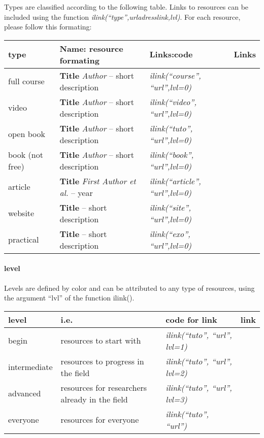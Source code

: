 \documentclass[
]{article}
\begin{document}
Types are classified according to the following table. Links to
resources can be included using the function
\emph{ilink(``type'',urladresslink,lvl)}. For each resource, please
follow this formating:

\begin{longtable}[]{@{}
  >{\raggedright\arraybackslash}p{}
  >{\raggedright\arraybackslash}p{}
  >{\raggedright\arraybackslash}p{}
  >{\raggedright\arraybackslash}p{}@{}}
\toprule
type & Name: resource formating & Links:code & Links \\
\midrule
\endhead
full course & \textbf{Title} \emph{Author} -- short description &
\emph{ilink(``course'', ``url'',lvl=0)} & \\
video & \textbf{Title} \emph{Author} -- short description &
\emph{ilink(``video'', ``url'',lvl=0)} & \\
open book & \textbf{Title} \emph{Author} -- short description &
\emph{ilink(``tuto'', ``url'',lvl=0)} & \\
book (not free) & \textbf{Title} \emph{Author} -- short description &
\emph{ilink(``book'', ``url'',lvl=0)} & \\
article & \textbf{Title} \emph{First Author et al.} -- year &
\emph{ilink(``article'', ``url'',lvl=0)} & \\
website & \textbf{Title} -- short description & \emph{ilink(``site'',
``url'',lvl=0)} & \\
practical & \textbf{Title} -- short description & \emph{ilink(``exo'',
``url'',lvl=0)} & \\
\bottomrule
\end{longtable}

\hypertarget{level}{%
\paragraph{level}\label{level}}

Levels are defined by color and can be attributed to any type of
resources, using the argument ``lvl'' of the function ilink().

\begin{longtable}[]{@{}
  >{\raggedright\arraybackslash}p{}
  >{\raggedright\arraybackslash}p{}
  >{\raggedright\arraybackslash}p{}
  >{\raggedright\arraybackslash}p{}@{}}
\toprule
level & i.e. & code for link & link \\
\midrule
\endhead
begin & resources to start with & \emph{ilink(``tuto'', ``url'', lvl=1)}
& \\
intermediate & resources to progress in the field &
\emph{ilink(``tuto'', ``url'', lvl=2)} & \\
advanced & resources for researchers already in the field &
\emph{ilink(``tuto'', ``url'', lvl=3)} & \\
everyone & resources for everyone & \emph{ilink(``tuto'', ``url'')} & \\
\bottomrule
\end{longtable}
\end{document}
